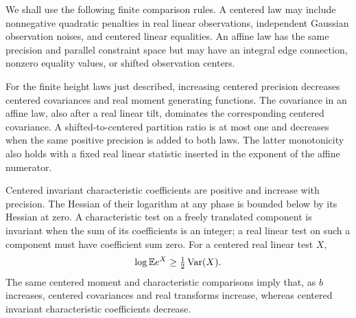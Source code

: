 We shall use the following finite comparison rules.  A centered law may
include nonnegative quadratic penalties in real linear observations,
independent Gaussian observation noises, and centered linear equalities.
An affine law has the same precision and parallel constraint space but
may have an integral edge connection, nonzero equality values, or shifted
observation centers.

\begin{lemma}\label{lem:comparisons}
For the finite height laws just described, increasing centered precision
decreases centered covariances and real moment generating functions.
The covariance in an affine law, also after a real linear tilt, dominates
the corresponding centered covariance.  A shifted-to-centered partition
ratio is at most one and decreases when the same positive precision is
added to both laws.  The latter monotonicity also holds with a fixed real
linear statistic inserted in the exponent of the affine numerator.

Centered invariant characteristic coefficients are positive and increase
with precision.  The Hessian of their logarithm at any phase is bounded
below by its Hessian at zero.  A characteristic test on a freely translated
component is invariant when the sum of its coefficients is an integer;
a real linear test on such a component must have coefficient sum zero.
For a centered real linear test $X$,
\begin{equation}\label{eq:laplace-lower}
                    \log\mathbb E e^X\ge\tfrac12\operatorname{Var}(X).
\end{equation}
The same centered moment and characteristic comparisons imply that, as
$b$ increases, centered covariances and real transforms increase, whereas
centered invariant characteristic coefficients decrease.
\end{lemma}

